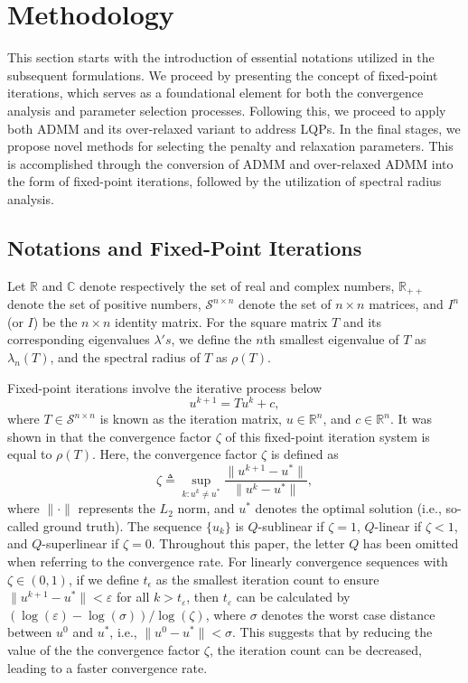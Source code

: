 \documentclass[letterpaper]{article} %
\begin{document}
\section{Methodology}
This section starts with the introduction of essential notations utilized in the subsequent formulations. We proceed by presenting the concept of fixed-point iterations, which serves as a foundational element for both the convergence analysis and parameter selection processes. Following this, we proceed to apply both ADMM and its over-relaxed variant to address LQPs. In the final stages, we propose novel methods for selecting the penalty and relaxation parameters. This is accomplished through the conversion of ADMM and over-relaxed ADMM into the form of fixed-point iterations, followed by the utilization of spectral radius analysis.

\subsection{Notations and Fixed-Point Iterations}
Let $\mathbb{R}$ and $\mathbb{C}$ denote respectively the set of real and complex numbers, $\mathbb{R}_{++}$ denote the set of positive numbers, $\mathcal{S}^{n\times n}$ denote the set of $n \times n$ matrices, and $I^n$ (or $I$) be the $n \times n$ identity matrix. For the square matrix $T$ and its corresponding eigenvalues $\lambda's$, we define the $n$th smallest eigenvalue of $T$ as $\lambda_n(T)$, and the spectral radius of $T$ as $\rho(T)$. 

Fixed-point iterations involve the iterative process below
\begin{equation*}
	u^{k+1}=Tu^{k}+c,
\end{equation*}
where $T \in \mathcal{S}^{n\times n}$ is known as the iteration matrix, $u\in \mathbb{R}^{n}$, and $c\in \mathbb{R}^{n}$. It was shown in  \cite{ghadimi2014optimal} that the convergence factor $\zeta$ of this fixed-point iteration system is equal to $\rho(T)$. Here, the convergence factor $\zeta$ is defined as
\begin{equation*}
	\zeta\triangleq \sup\limits_{k:u^k\neq u^*}\frac{\|u^{k+1}-u^*\|}{\|u^{k}-u^*\|},
\end{equation*}
where $\|\cdot\|$ represents the $L_2$ norm, and $u^{*}$ denotes the optimal solution (i.e., so-called ground truth).  The sequence $\{u_k\}$ is $Q$-sublinear if $\zeta=1$, $Q$-linear if $\zeta<1$, and $Q$-superlinear if $\zeta=0$. Throughout this paper, the letter $Q$ has been omitted when referring to the convergence rate. For linearly convergence sequences with $\zeta\in (0,1)$, if we define $t_{\epsilon}$ as the smallest iteration count to ensure $\|u^{k+1}-u^{*}\|<\varepsilon$ for all $k>t_{\varepsilon}$, then $t_{\varepsilon}$ can be calculated by $\left(\log(\varepsilon)-\log(\sigma)\right)/ \log(\zeta)$, where $\sigma$ denotes the worst case distance between $u^{0}$ and $u^{*}$, i.e., $\|u^{0}-u^{*}\|<\sigma$. This suggests that by reducing the value of the the convergence factor $\zeta$, the iteration count can be decreased, leading to a faster convergence rate. 
\end{document}
